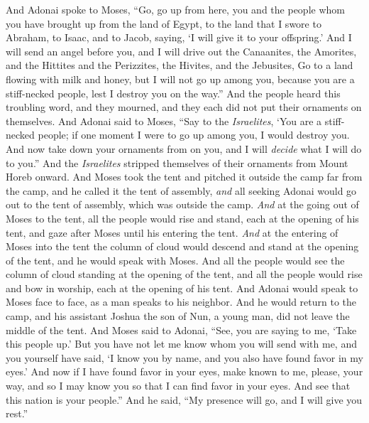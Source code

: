 \begin{biblechapter} %
 And Adonai spoke to Moses, “Go, go up from here, you and the people whom you have brought up from the land of Egypt, to the land that I swore to Abraham, to Isaac, and to Jacob, saying, ‘I will give it to your offspring.’
\verse And I will send an angel before you, and I will drive out the Canaanites, the Amorites, and the Hittites and the Perizzites, the Hivites, and the Jebusites,
\verse Go to a land flowing with milk and honey, but I will not go up among you, because you are a stiff-necked people, lest I destroy you on the way.”
\verse And the people heard this troubling word, and they mourned, and they each did not put their ornaments on themselves.
\verse And Adonai said to Moses, “Say to the \textit{Israelites}, ‘You are a stiff-necked people; if one moment I were to go up among you, I would destroy you. And now take down your ornaments from on you, and I will \textit{decide} what I will do to you.”
\verse And the \textit{Israelites} stripped themselves of their ornaments from Mount Horeb onward.
 And Moses took the tent and pitched it outside the camp far from the camp, and he called it the tent of assembly, \textit{and} all seeking Adonai would go out to the tent of assembly, which was outside the camp.
\verse \textit{And} at the going out of Moses to the tent, all the people would rise and stand, each at the opening of his tent, and gaze after Moses until his entering the tent.
\verse \textit{And} at the entering of Moses into the tent the column of cloud would descend and stand at the opening of the tent, and he would speak with Moses.
\verse And all the people would see the column of cloud standing at the opening of the tent, and all the people would rise and bow in worship, each at the opening of his tent.
\verse And Adonai would speak to Moses face to face, as a man speaks to his neighbor. And he would return to the camp, and his assistant Joshua the son of Nun, a young man, did not leave the middle of the tent.
 And Moses said to Adonai, “See, you are saying to me, ‘Take this people up.’ But you have not let me know whom you will send with me, and you yourself have said, ‘I know you by name, and you also have found favor in my eyes.’
\verse And now if I have found favor in your eyes, make known to me, please, your way, and so I may know you so that I can find favor in your eyes. And see that this nation is your people.”
\verse And he said, “My presence will go, and I will give you rest.”

\end{biblechapter}
